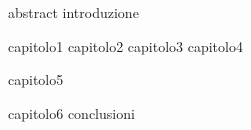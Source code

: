 \documentclass[10pt,a4paper,twoside]{book}
\theoremstyle{plain}
\theoremstyle{definition}
\theoremstyle{remark}
\begin{document}
\maketitle
 {abstract}
\renewcommand{\theequation}{\arabic{equation}}%
\renewcommand{\thesection}{\arabic{section}}%
 {introduzione}
\renewcommand{\theequation}{\thechapter.\arabic{equation}}%
\renewcommand{\thesection}{\thechapter.\arabic{section}}%
\tableofcontents

 {capitolo1}
 {capitolo2}
 {capitolo3}
 {capitolo4}

 {capitolo5}

 {capitolo6}
\renewcommand{\theequation}{\arabic{equation}}%
\renewcommand{\thesection}{\arabic{section}}%
 {conclusioni}
\renewcommand{\theequation}{\thechapter.\arabic{equation}}%
\renewcommand{\thesection}{\thechapter.\arabic{section}}%
\appendix

\backmatter
\listoffigures
\listoftables

 
 
\end{document}
